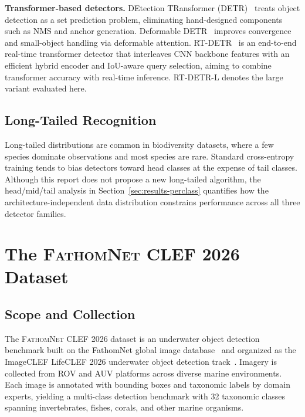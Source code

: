 \documentclass[11pt,a4paper]{article}
\newcommand{\dataset}{\textsc{FathomNet CLEF 2026}}
\begin{document}
\textbf{Transformer-based detectors.} DEtection TRansformer (DETR)~\cite{detr2020} treats object detection as a set prediction problem, eliminating hand-designed components such as NMS and anchor generation. Deformable DETR~\cite{deformable-detr2021} improves convergence and small-object handling via deformable attention. RT-DETR~\cite{rtdetr2024} is an end-to-end real-time transformer detector that interleaves CNN backbone features with an efficient hybrid encoder and IoU-aware query selection, aiming to combine transformer accuracy with real-time inference. RT-DETR-L denotes the large variant evaluated here.

\subsection{Long-Tailed Recognition}
Long-tailed distributions are common in biodiversity datasets, where a few species dominate observations and most species are rare. Standard cross-entropy training tends to bias detectors toward head classes at the expense of tail classes. Although this report does not propose a new long-tailed algorithm, the head/mid/tail analysis in Section~\ref{sec:results-perclass} quantifies how the architecture-independent data distribution constrains performance across all three detector families.

\section{The \dataset{} Dataset}
\label{sec:dataset}

\subsection{Scope and Collection}
The \dataset{} dataset is an underwater object detection benchmark built on the FathomNet global image database~\cite{fathomnet2022,fathomnet-2021-workshop} and organized as the ImageCLEF LifeCLEF 2026 underwater object detection track~\cite{fathomnet-clef-2026}. Imagery is collected from ROV and AUV platforms across diverse marine environments. Each image is annotated with bounding boxes and taxonomic labels by domain experts, yielding a multi-class detection benchmark with 32 taxonomic classes spanning invertebrates, fishes, corals, and other marine organisms.
\end{document}

